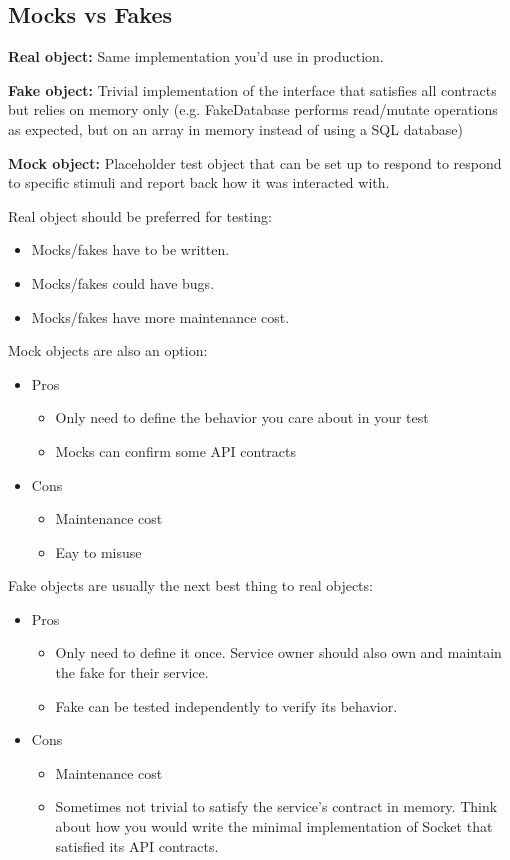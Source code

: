 \documentclass{article}
\begin{document}
\subsection{Mocks vs Fakes}

\textbf{Real object: } Same implementation you'd use in production.

\textbf{Fake object: } Trivial implementation of the interface that satisfies all contracts but relies on memory only (e.g. FakeDatabase performs read/mutate operations as expected, but on an array in memory instead of using a SQL database)

\textbf{Mock object: } Placeholder test object that can be set up to respond to respond to specific stimuli and report back how it was interacted with.

\vspace*{1em}

Real object should be preferred for testing:
\begin{itemize}
    \item Mocks/fakes have to be written.
    \item Mocks/fakes could have bugs. 
    \item Mocks/fakes have more maintenance cost.
\end{itemize}

Mock objects are also an option:
\begin{itemize}
    \item Pros
    \begin{itemize}
        \item Only need to define the behavior you care about in your test
        \item Mocks can confirm some API contracts
    \end{itemize}
    \item Cons
    \begin{itemize}
        \item Maintenance cost
        \item Eay to misuse
    \end{itemize}
\end{itemize}

Fake objects are usually the next best thing to real objects:
\begin{itemize}
    \item Pros 
    \begin{itemize}
        \item Only need to define it once. Service owner should also own and maintain the fake for their service.
        \item Fake can be tested independently to verify its behavior.
    \end{itemize}
    \item Cons 
    \begin{itemize}
        \item Maintenance cost
        \item Sometimes not trivial to satisfy the service's contract in memory. Think about how you would write the minimal implementation of Socket that satisfied its API contracts.
    \end{itemize}
\end{itemize}
\end{document}
